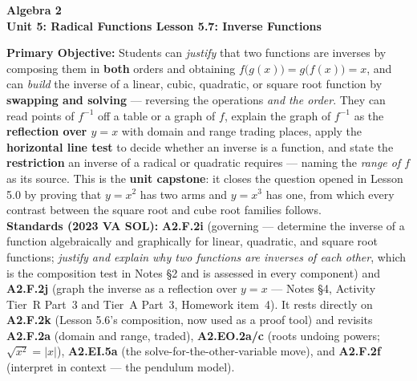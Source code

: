 \documentclass[10pt]{article}
\newcommand{\CourseName}{Algebra 2}
\newcommand{\UnitNumberName}{Unit 5: Radical Functions \quad}
\newcommand{\LessonNumberName}{Lesson 5.7: Inverse Functions}
\begin{document}
\begin{center}
    {\Large\bfseries \CourseName \\
    {\small\bfseries \UnitNumberName \LessonNumberName}}
\end{center}

\begin{tcolorbox}[colback=forestbg, colframe=forest, boxrule=0.9pt, arc=2mm,
    left=2mm, right=2mm, top=1.5mm, bottom=1.5mm]
    \textbf{Primary Objective:} Students can \emph{justify} that two functions are inverses by
    composing them in \textbf{both} orders and obtaining $f\big(g(x)\big)=g\big(f(x)\big)=x$, and can
    \emph{build} the inverse of a linear, cubic, quadratic, or square root function by
    \textbf{swapping and solving} --- reversing the operations \emph{and the order}. They can read
    points of $f^{-1}$ off a table or a graph of $f$, explain the graph of $f^{-1}$ as the
    \textbf{reflection over $y=x$} with domain and range trading places, apply the
    \textbf{horizontal line test} to decide whether an inverse is a function, and state the
    \textbf{restriction} an inverse of a radical or quadratic requires --- naming the \emph{range of
    $f$} as its source. This is the \textbf{unit capstone}: it closes the question opened in Lesson
    5.0 by proving that $y=x^{2}$ has two arms and $y=x^{3}$ has one, from which every contrast
    between the square root and cube root families follows.
    \\[2pt]
    \textbf{Standards (2023 VA SOL):} \textbf{A2.F.2i} (governing --- determine the inverse of a
    function algebraically and graphically for linear, quadratic, and square root functions;
    \emph{justify and explain why two functions are inverses of each other}, which is the
    composition test in Notes \S2 and is assessed in every component) and \textbf{A2.F.2j} (graph
    the inverse as a reflection over $y=x$ --- Notes \S4, Activity Tier~R Part~3 and Tier~A Part~3,
    Homework item~4). It rests directly on \textbf{A2.F.2k} (Lesson 5.6's composition, now used as
    a proof tool) and revisits \textbf{A2.F.2a} (domain and range, traded), \textbf{A2.EO.2a/c}
    (roots undoing powers; $\sqrt{x^{2}}=|x|$), \textbf{A2.EI.5a} (the solve-for-the-other-variable
    move), and \textbf{A2.F.2f} (interpret in context --- the pendulum model).
\end{tcolorbox}
\end{document}
